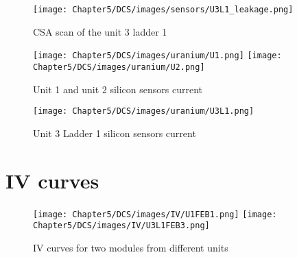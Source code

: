 \begin{figure}[h!]
\centering
\texttt{[image: Chapter5/DCS/images/sensors/U3L1\_leakage.png]}
\caption{CSA scan of the unit 3 ladder 1}
\label{U3L0CSABIAS}
\end{figure}





\begin{figure}[h!]
\centering
\texttt{[image: Chapter5/DCS/images/uranium/U1.png]}
\texttt{[image: Chapter5/DCS/images/uranium/U2.png]}
\caption{Unit 1 and unit 2 silicon sensors current}
\label{fig_U1U2}
\end{figure}

\begin{figure}[h!]
\centering
\texttt{[image: Chapter5/DCS/images/uranium/U3L1.png]}
\caption{Unit 3 Ladder 1 silicon sensors current}
\label{fig_U3L1}
\end{figure}



\chapter{IV curves}
\label{IV}

\begin{figure}[h!]
\centering
\texttt{[image: Chapter5/DCS/images/IV/U1FEB1.png]}
\texttt{[image: Chapter5/DCS/images/IV/U3L1FEB3.png]}
\caption{IV curves for two modules from different units}
\label{fig_U3L1}
\end{figure}

